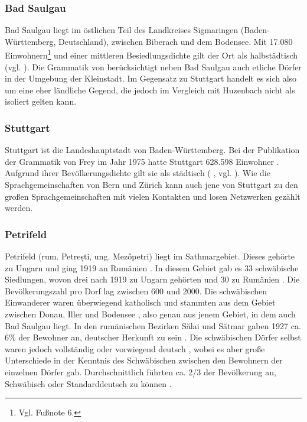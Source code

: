 \subsubsection{Bad Saulgau}

Bad Saulgau liegt im östlichen Teil des Landkreises Sigmaringen (Ba\-den-Würt\-tem\-berg, Deutschland), zwischen Biberach und dem Bodensee. Mit 17.080 Einwohnern\footnote{Vgl. Fußnote 6.} und einer mittleren Besiedlungsdichte \citep{Bund2014} gilt der Ort als halbstädtisch (vgl. \citealt{Eurostat2011}). Die Grammatik von \citet{Raichle1932} berücksichtigt neben Bad Saulgau auch etliche Dörfer in der Umgebung der Kleinstadt. Im Gegensatz zu Stuttgart handelt es sich also um eine eher ländliche Gegend, die jedoch im Vergleich mit Huzenbach nicht als isoliert gelten kann.

\subsubsection{Stuttgart}

Stuttgart ist die Landeshauptstadt von Ba\-den-Würt\-tem\-berg. Bei der Publikation der Grammatik von Frey im Jahr 1975 hatte Stuttgart 628.598 Einwohner \citep{Stuttgart2015}. Aufgrund ihrer Bevölkerungsdichte gilt sie als städtisch ( \citealt{Bund2014}, vgl. \citealt{Eurostat2011} ). Wie die Sprachgemeinschaften von Bern und Zürich kann auch jene von Stuttgart zu den großen Sprachgemeinschaften mit vielen Kontakten und losen Netzwerken gezählt werden.

\subsubsection{Petrifeld}

Petrifeld (rum. Petrești, ung. Mezőpetri) liegt im Sathmargebiet. Dieses gehörte zu Ungarn und ging 1919 an Rumänien \citep[14]{Moser1937}. In diesem Gebiet gab es 33 schwäbische Siedlungen, wovon drei nach 1919 zu Ungarn gehörten und 30 zu Rumänien \citep[15--16]{Moser1937}. Die Bevölkerungszahl pro Dorf lag zwischen 600 und 2000. Die schwäbischen Einwanderer waren überwiegend katholisch \citep[16]{Moser1937} und stammten aus dem Gebiet zwischen Donau, Iller und Bodensee \citep[Karte 1 und 2]{Moser1937}, also genau aus jenem Gebiet, in dem auch Bad Saulgau liegt. In den rumänischen Bezirken Sălai und Sătmar gaben 1927 ca. 6\% der Bewohner an, deutscher Herkunft zu sein \citep[15--16]{Moser1937}. Die schwäbischen Dörfer selbst waren jedoch vollständig oder vorwiegend deutsch \citep[16]{Moser1937}, wobei es aber große Unterschiede in der Kenntnis des Schwäbischen zwischen den Bewohnern der einzelnen Dörfer gab. Durchschnittlich führten ca. 2/3 der Bevölkerung an, Schwäbisch oder Standarddeutsch zu können \citep[17]{Moser1937}.

